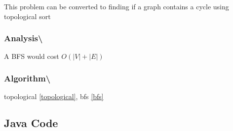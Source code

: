 \documentclass[]{book}
\begin{document}
This problem can be converted to finding if a graph contains a cycle using topological sort

\hypertarget{analysis-102}{%
\subsubsection{Analysis\textbackslash{}}\label{analysis-102}}

A BFS would cost \(O(|V| + |E|)\)

\hypertarget{algorithm-108}{%
\subsubsection{Algorithm\textbackslash{}}\label{algorithm-108}}

topological \ref{topological}, bfs \ref{bfs}

\hypertarget{java-code-63}{%
\subsection{Java Code}\label{java-code-63}}
\end{document}
